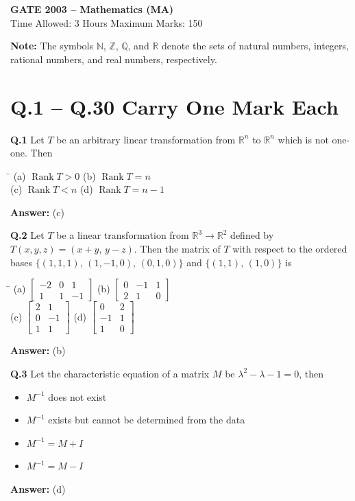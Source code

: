 \documentclass[11pt,a4paper]{article}
\newcommand{\optsfour}[4]{%
  \begin{tabbing}
    \hspace{0.48\linewidth}\=\kill
    (a) #1 \> (b) #2 \\[2pt]
    (c) #3 \> (d) #4
  \end{tabbing}%
}
\newcommand{\optslist}[4]{%
  \begin{itemize}
    \setlength{\itemsep}{2pt}\setlength{\parskip}{0pt}
    \item[(a)] #1
    \item[(b)] #2
    \item[(c)] #3
    \item[(d)] #4
  \end{itemize}%
}
\newcommand{\ans}[1]{\textbf{Answer:} #1\par\medskip}
\begin{document}

\begin{center}
  {\Large\bfseries GATE 2003 -- Mathematics (MA)}\\[4pt]
  {\small Time Allowed: 3 Hours \quad\textbar\quad Maximum Marks: 150}
\end{center}

\medskip
\textbf{Note:} The symbols $\mathbb{N}$, $\mathbb{Z}$, $\mathbb{Q}$, and $\mathbb{R}$ denote the sets of natural numbers, integers, rational numbers, and real numbers, respectively.

\section*{Q.1 -- Q.30 Carry One Mark Each}

\textbf{Q.1} Let $T$ be an arbitrary linear transformation from $\mathbb{R}^n$ to $\mathbb{R}^n$ which is not one-one. Then
\optsfour{$\operatorname{Rank} T > 0$}{$\operatorname{Rank} T = n$}{$\operatorname{Rank} T < n$}{$\operatorname{Rank} T = n - 1$}
\ans{(c)}

\textbf{Q.2} Let $T$ be a linear transformation from $\mathbb{R}^3 \to \mathbb{R}^2$ defined by $T(x,y,z) = (x+y,\, y-z)$. Then the matrix of $T$ with respect to the ordered bases $\{(1,1,1),\, (1,-1,0),\, (0,1,0)\}$ and $\{(1,1),\, (1,0)\}$ is
\optsfour{$\begin{bmatrix} -2 & 0 & 1 \\ 1 & 1 & -1 \end{bmatrix}$}{$\begin{bmatrix} 0 & -1 & 1 \\ 2 & 1 & 0 \end{bmatrix}$}{$\begin{bmatrix} 2 & 1 \\ 0 & -1 \\ 1 & 1 \end{bmatrix}$}{$\begin{bmatrix} 0 & 2 \\ -1 & 1 \\ 1 & 0 \end{bmatrix}$}
\ans{(b)}

\textbf{Q.3} Let the characteristic equation of a matrix $M$ be $\lambda^2 - \lambda - 1 = 0$, then
\optslist{$M^{-1}$ does not exist}{$M^{-1}$ exists but cannot be determined from the data}{$M^{-1} = M + I$}{$M^{-1} = M - I$}
\ans{(d)}
\end{document}
